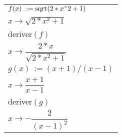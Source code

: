 \begin{enumerate}
     \begin{center}
          \begin{extern}%
               \renewcommand{\arraystretch}{1.5}
               \begin{tabular}{|l|}
                    \hline
                    $f(x)~:= \text{sqrt}(2*x\verb+^+2+1)$	\\
                    \hspace{1.5cm}$x \to  \sqrt{2*x^2+1}$	\\ \hline
                    deriver$(f)$							\\
                    \hspace{1.5cm}$x \to \dfrac{2*x}{\sqrt{2*x^2+ 1}}$ \\[0.3cm] \hline
                    $g(x)~:=(x+1)/(x-1)$					\\
                    \hspace{1.5cm}$x \to \dfrac{x + 1}{x - 1}$ \\[0.2cm] \hline
                    deriver$(g)$							\\
                    \hspace{1.5cm}$x \to  - \dfrac{2}{(x - 1)^2}$ \\[0.2cm] \hline
               \end{tabular}
          \end{extern}
     \end{center}
\end{enumerate}
